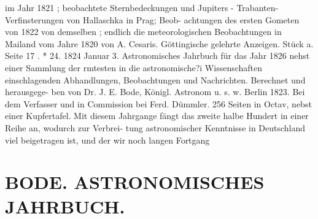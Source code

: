 \documentclass[12pt,a4paper]{article}
\begin{document}
{{{{{{{{ im  Jahr  1821 ; beobachtete  Sternbedeckungen  und  Jupiters  -  Trabanten- Verfinsterungen  von  Hallaschka  in  Prag;  Beob- achtungen des  ersten  Gometen  von  1822  von  demselben ;  endlich  die  meteorologischen  Beobachtungen  in Mailand  vom  Jahre  1820  von  A.  Cesaris. Göttingische  gelehrte  Anzeigen.     Stück  a.     Seite  17  .  *  24.     1824  Januar  3. Astronomisches  Jahrbuch  für  das  Jahr  1826  nehst  einer  Sammlung  der  rmtesten  in  die  astronomische?i Wissenschaften  einschlagenden  Abhandlungen,  Beobachtungen  und  Nachrichten.  Berechnet  und  herausgege- ben von  Dr.  J.  E.  Bode,  Königl.  Astronom  u.  s.  w.  Berlin  1823.  Bei  dem  Verfasser  und  in  Commission bei  Ferd.  Dümmler.     256  Seiten  in  Octav,  nebst  einer  Kupfertafel. Mit  diesem  Jahrgange  fängt  das  zweite  halbe  Hundert  in  einer  Reihe  an,  wodurch  zur  Verbrei- tung astronomischer  Kenntnisse  in  Deutschland  viel  beigetragen  ist,  und  der  wir  noch  langen  Fortgang


\section*{BODE.   ASTRONOMISCHES  JAHRBUCH.}

}}}}}}}}
\end{document}
